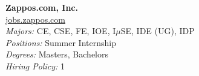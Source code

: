 \documentclass[twoside]{article}
\begin{document}
\begin{center}
\begin{multicols}{3}
\begin{minipage}{.9\columnwidth}{\Large\bf Zappos.com, Inc. }\\
	\url{jobs.zappos.com}\\
	\emph{Majors:} CE, CSE, FE, IOE, I$\mu$SE, IDE (UG), IDP\\
	\emph{Positions:} Summer Internship\\
	\emph{Degrees:} Masters, Bachelors\\
	\emph{Hiring Policy:} 1\\
\end{minipage}
 
\end{multicols}\end{center}
\end{document}
